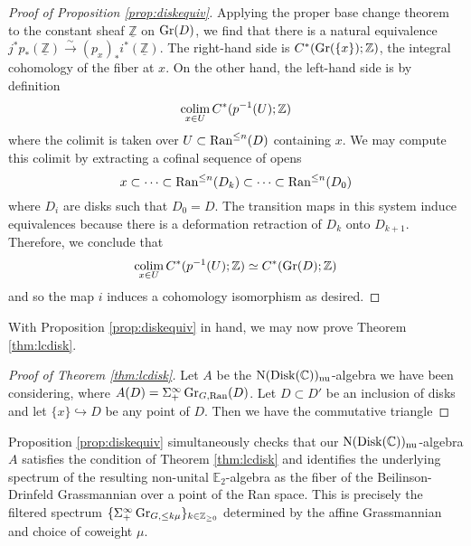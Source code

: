 \begin{proof}[Proof of Proposition \ref{prop:diskequiv}]
Applying the proper base change theorem to the constant sheaf $\underline{\mathbb{Z}}$ on $\operatorname{\mathrm{Gr}}(D)$, we find that there is a natural equivalence $j^*p_*(\underline{\mathbb{Z}}) \xrightarrow{\sim} (p_x)_{*}i^*(\underline{\mathbb{Z}}).$  The right-hand side is $C^*(\operatorname{\mathrm{Gr}}(\{x\}) ;\mathbb{Z})$, the integral cohomology of the fiber at $x$.  On the other hand, the left-hand side is by definition $$\operatorname*{\mathrm{colim}}_{x\in U} C^*(p^{-1}(U);\mathbb{Z})$$ where the colimit is taken over $U\subset \operatorname{\mathrm{Ran}}^{\leq n}(D)$ containing $x$.  We may compute this colimit by extracting a cofinal sequence of opens $$x \subset \cdots \subset \operatorname{\mathrm{Ran}}^{\leq n}(D_k) \subset \cdots \subset \operatorname{\mathrm{Ran}}^{\leq n}(D_0)$$ where $D_i$ are disks such that $D_0=D$.  The transition maps in this system induce equivalences because there is a deformation retraction of $D_k$ onto $D_{k+1}$.  Therefore, we conclude that $$\operatorname*{\mathrm{colim}}_{x\in U} C^*(p^{-1}(U);\mathbb{Z}) \simeq C^*(\operatorname{\mathrm{Gr}}(D); \mathbb{Z})$$ and so the map $i$ induces a cohomology isomorphism as desired.  
\end{proof} 

With Proposition \ref{prop:diskequiv} in hand, we may now prove Theorem \ref{thm:lcdisk}.

\begin{proof}[Proof of Theorem \ref{thm:lcdisk}]
Let $A$ be the $\operatorname{\mathrm{N}} (\mathrm{Disk}(\mathbb{C}))_{\mathrm{nu}}$-algebra we have been considering, where $A(D) = \Sigma^{\infty}_+ \operatorname{\mathrm{Gr}}_{G,\operatorname{\mathrm{Ran}}}(D)$.  Let $D \subset D'$ be an inclusion of disks and let $\{x \} \hookrightarrow D$ be any point of $D$.  Then we have the commutative triangle
\begin{comment}
\begin{equation*}
\begin{tikzcd}
& \Gra_{G,\Ran}(D}\arrow[d] \\
\Gra_{G,\Ran}(\{x\}) \arrow[ru]\arrow[r] &\Gra_{G,\Ran}(D') \\
\end{tikzcd}
\end{equation*}
\end{comment}
\end{proof}

Proposition \ref{prop:diskequiv} simultaneously checks that our $\operatorname{\mathrm{N}} (\mathrm{Disk}(\mathbb{C}))_{\mathrm{nu}}$-algebra $A$ satisfies the condition of Theorem \ref{thm:lcdisk} and identifies the underlying spectrum of the resulting non-unital $\mathbb{E}_2$-algebra as the fiber of the Beilinson-Drinfeld Grassmannian over a point of the Ran space.  This is precisely the filtered spectrum $\{ \Sigma^{\infty}_+ \operatorname{\mathrm{Gr}}_{G,\leq k\mu}\}_{k \in \mathbb{Z}_{\geq 0}}$ determined by the affine Grassmannian and choice of coweight $\mu$.  

